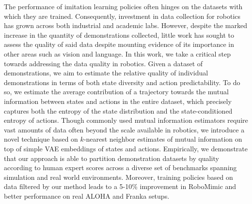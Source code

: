 The performance of imitation learning policies often hinges on the datasets with which they are trained. Consequently, investment in data collection for robotics has grown across both industrial and academic labs. However, despite the marked increase in the quantity of demonstrations collected, little work has sought to assess the quality of said data despite mounting evidence of its importance in other areas such as vision and language. In this work, we take a critical step towards addressing the data quality in robotics. Given a dataset of demonstrations, we aim to estimate the relative quality of individual demonstrations in terms of both state diversity and action predictability. To do so, we estimate the average contribution of a trajectory towards the mutual information between states and actions in the entire dataset, which precisely captures both the entropy of the state distribution and the state-conditioned entropy of actions. Though commonly used mutual information estimators require vast amounts of data often beyond the scale available in robotics, we introduce a novel technique based on $k$-nearest neighbor estimates of mutual information on top of simple VAE embeddings of states and actions. Empirically, we demonstrate that our approach is able to partition demonstration datasets by quality according to human expert scores across a diverse set of benchmarks spanning simulation and real world environments. Moreover, training policies based on data filtered by our method leads to a 5-10\% improvement in RoboMimic and better performance on real ALOHA and Franka setups.   
